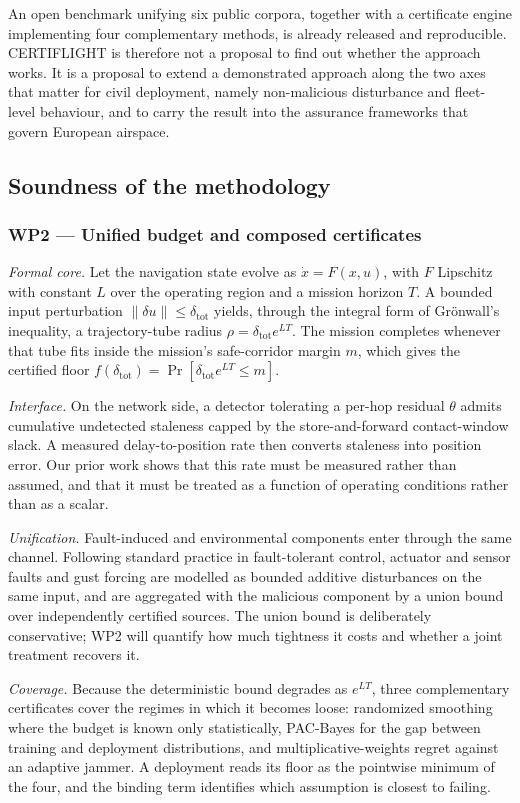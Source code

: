 \documentclass[11pt,a4paper]{article}
\begin{document}
An open benchmark unifying six public corpora, together with a certificate engine implementing four complementary methods, is already released and reproducible. CERTIFLIGHT is therefore not a proposal to find out whether the approach works. It is a proposal to extend a demonstrated approach along the two axes that matter for civil deployment, namely non-malicious disturbance and fleet-level behaviour, and to carry the result into the assurance frameworks that govern European airspace.

\subsection{Soundness of the methodology}

\subsubsection{WP2 --- Unified budget and composed certificates}
\emph{Formal core.} Let the navigation state evolve as $\dot x = F(x,u)$, with $F$ Lipschitz with constant $L$ over the operating region and a mission horizon $T$. A bounded input perturbation $\lVert\delta u\rVert \le \delta_{\text{tot}}$ yields, through the integral form of Gr\"onwall's inequality, a trajectory-tube radius $\rho = \delta_{\text{tot}}e^{LT}$. The mission completes whenever that tube fits inside the mission's safe-corridor margin $m$, which gives the certified floor $f(\delta_{\text{tot}}) = \Pr[\delta_{\text{tot}}e^{LT}\le m]$.

\emph{Interface.} On the network side, a detector tolerating a per-hop residual $\theta$ admits cumulative undetected staleness capped by the store-and-forward contact-window slack. A measured delay-to-position rate then converts staleness into position error. Our prior work shows that this rate must be measured rather than assumed, and that it must be treated as a function of operating conditions rather than as a scalar.

\emph{Unification.} Fault-induced and environmental components enter through the same channel. Following standard practice in fault-tolerant control, actuator and sensor faults and gust forcing are modelled as bounded additive disturbances on the same input, and are aggregated with the malicious component by a union bound over independently certified sources. The union bound is deliberately conservative; WP2 will quantify how much tightness it costs and whether a joint treatment recovers it.

\emph{Coverage.} Because the deterministic bound degrades as $e^{LT}$, three complementary certificates cover the regimes in which it becomes loose: randomized smoothing where the budget is known only statistically, PAC-Bayes for the gap between training and deployment distributions, and multiplicative-weights regret against an adaptive jammer. A deployment reads its floor as the pointwise minimum of the four, and the binding term identifies which assumption is closest to failing.
\end{document}
